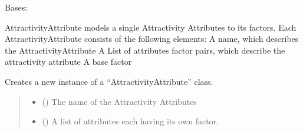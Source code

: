 \documentclass[letterpaper,10pt,english]{sphinxmanual}
\begin{document}
\begin{fulllineitems}
\label{\detokenize{apidoc/src.osm_configurator.model.project.configuration:src.osm_configurator.model.project.configuration.attractivity_attribute.AttractivityAttribute}}
\pysigstartsignatures
{}
\pysigstopsignatures
\sphinxAtStartPar
Bases: 

\sphinxAtStartPar
AttractivityAttribute models a single Attractivity Attributes to its factors.
Each AttractivityAttribute consists of the following elements:
\sphinxhyphen{} A name, which describes the AttractivityAttribute
\sphinxhyphen{} A List of attributes factor pairs, which describe the attractivity attribute
\sphinxhyphen{} A base factor

\begin{fulllineitems}
\label{\detokenize{apidoc/src.osm_configurator.model.project.configuration:src.osm_configurator.model.project.configuration.attractivity_attribute.AttractivityAttribute.__init__}}
\pysigstartsignatures
{}
\pysigstopsignatures
\sphinxAtStartPar
Creates a new instance of a “AttractivityAttribute” class.
\begin{quote}\begin{description}
\begin{itemize}
\item {} 
\sphinxAtStartPar
{} () \textendash{} The name of the Attractivity Attributes

\item {} 
\sphinxAtStartPar
{} (\sphinxstyleliteralemphasis{\sphinxupquote{{[}}}\sphinxstyleliteralemphasis{\sphinxupquote{, }}\sphinxstyleliteralemphasis{\sphinxupquote{)}}\sphinxstyleliteralemphasis{\sphinxupquote{{]}}}) \textendash{} A list of attributes each having its own factor.


\end{itemize}
\end{description}
\end{quote}
\end{fulllineitems}
\end{fulllineitems}
\end{document}
